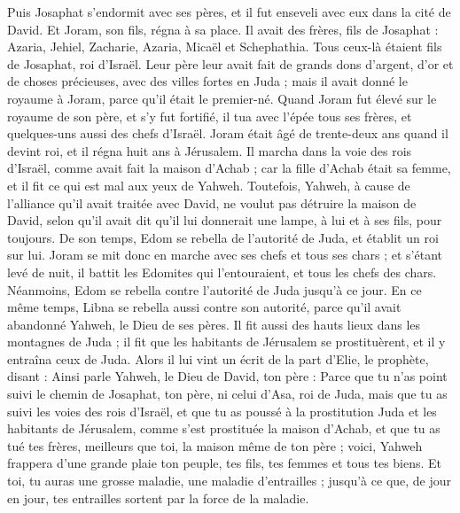 \begin{multicols}{2}
\VerseOne{}Puis Josaphat s'endormit avec ses pères, et il fut enseveli avec eux dans la cité de David. Et Joram, son fils, régna à sa place.
Il avait des frères, fils de Josaphat : Azaria, Jehiel, Zacharie, Azaria, Micaël et Schephathia. Tous ceux-là étaient fils de Josaphat, roi d'Israël.
Leur père leur avait fait de grands dons d'argent, d'or et de choses précieuses, avec des villes fortes en Juda ; mais il avait donné le royaume à Joram, parce qu'il était le premier-né.
Quand Joram fut élevé sur le royaume de son père, et s'y fut fortifié, il tua avec l'épée tous ses frères, et quelques-uns aussi des chefs d'Israël.
Joram était âgé de trente-deux ans quand il devint roi, et il régna huit ans à Jérusalem.
Il marcha dans la voie des rois d'Israël, comme avait fait la maison d'Achab ; car la fille d'Achab était sa femme, et il fit ce qui est mal aux yeux de Yahweh.
Toutefois, Yahweh, à cause de l'alliance qu'il avait traitée avec David, ne voulut pas détruire la maison de David, selon qu'il avait dit qu'il lui donnerait une lampe, à lui et à ses fils, pour toujours.
De son temps, Edom se rebella de l'autorité de Juda, et établit un roi sur lui.
Joram se mit donc en marche avec ses chefs et tous ses chars ; et s'étant levé de nuit, il battit les Edomites qui l'entouraient, et tous les chefs des chars.
Néanmoins, Edom se rebella contre l'autorité de Juda jusqu'à ce jour. En ce même temps, Libna se rebella aussi contre son autorité, parce qu'il avait abandonné Yahweh, le Dieu de ses pères.
Il fit aussi des hauts lieux dans les montagnes de Juda ; il fit que les habitants de Jérusalem se prostituèrent, et il y entraîna ceux de Juda.
Alors il lui vint un écrit de la part d'Elie, le prophète, disant : Ainsi parle Yahweh, le Dieu de David, ton père : Parce que tu n'as point suivi le chemin de Josaphat, ton père, ni celui d'Asa, roi de Juda,
mais que tu as suivi les voies des rois d'Israël, et que tu as poussé à la prostitution Juda et les habitants de Jérusalem, comme s'est prostituée la maison d'Achab, et que tu as tué tes frères, meilleurs que toi, la maison même de ton père ;
voici, Yahweh frappera d'une grande plaie ton peuple, tes fils, tes femmes et tous tes biens.
Et toi, tu auras une grosse maladie, une maladie d'entrailles ; jusqu'à ce que, de jour en jour, tes entrailles sortent par la force de la maladie.

\end{multicols}
